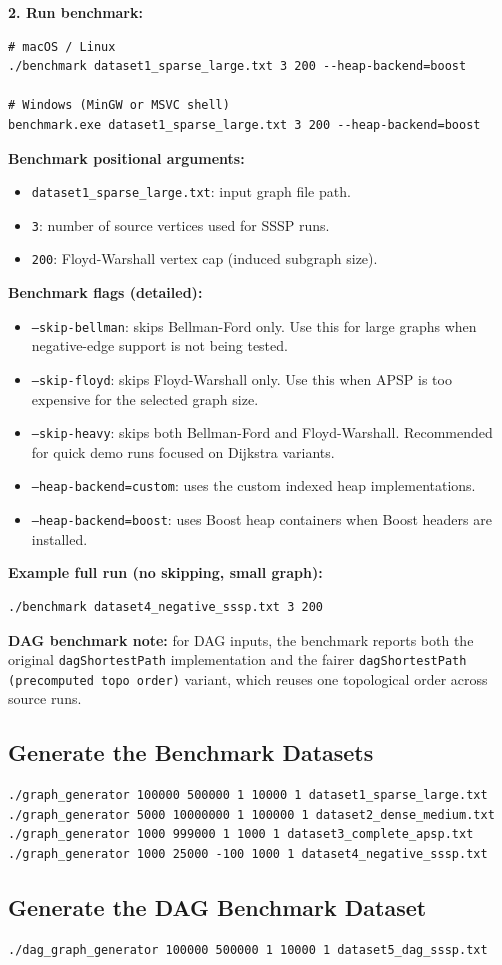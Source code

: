 \textbf{2. Run benchmark:}
\begin{verbatim}
# macOS / Linux
./benchmark dataset1_sparse_large.txt 3 200 --heap-backend=boost

# Windows (MinGW or MSVC shell)
benchmark.exe dataset1_sparse_large.txt 3 200 --heap-backend=boost
\end{verbatim}

\textbf{Benchmark positional arguments:}
\begin{itemize}
  \item \texttt{dataset1\_sparse\_large.txt}: input graph file path.
  \item \texttt{3}: number of source vertices used for SSSP runs.
  \item \texttt{200}: Floyd-Warshall vertex cap (induced subgraph size).
\end{itemize}

\textbf{Benchmark flags (detailed):}
\begin{itemize}
  \item \texttt{--skip-bellman}: skips Bellman-Ford only. Use this for large graphs when negative-edge support is not being tested.
  \item \texttt{--skip-floyd}: skips Floyd-Warshall only. Use this when APSP is too expensive for the selected graph size.
  \item \texttt{--skip-heavy}: skips both Bellman-Ford and Floyd-Warshall. Recommended for quick demo runs focused on Dijkstra variants.
  \item \texttt{--heap-backend=custom}: uses the custom indexed heap implementations.
  \item \texttt{--heap-backend=boost}: uses Boost heap containers when Boost headers are installed.
\end{itemize}

\textbf{Example full run (no skipping, small graph):}
\begin{verbatim}
./benchmark dataset4_negative_sssp.txt 3 200
\end{verbatim}

\textbf{DAG benchmark note:} for DAG inputs, the benchmark reports both the original \texttt{dagShortestPath} implementation and the fairer \texttt{dagShortestPath (precomputed topo order)} variant, which reuses one topological order across source runs.

\subsection{Generate the Benchmark Datasets}
\begin{verbatim}
./graph_generator 100000 500000 1 10000 1 dataset1_sparse_large.txt
./graph_generator 5000 10000000 1 100000 1 dataset2_dense_medium.txt
./graph_generator 1000 999000 1 1000 1 dataset3_complete_apsp.txt
./graph_generator 1000 25000 -100 1000 1 dataset4_negative_sssp.txt
\end{verbatim}

\subsection{Generate the DAG Benchmark Dataset}
\begin{verbatim}
./dag_graph_generator 100000 500000 1 10000 1 dataset5_dag_sssp.txt
\end{verbatim}